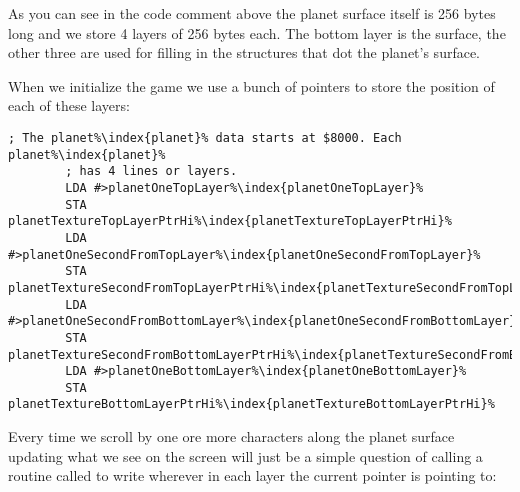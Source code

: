 As you can see in the code comment above the planet surface itself is 256 bytes long and we store 4 layers of 256
bytes each. The bottom layer is the surface, the other three are used for filling in the structures that dot the
planet's surface.

When we initialize the game we use a bunch of pointers to store the position of each of these layers:

\begin{lstlisting}[escapechar=\%]
        ; The planet%\index{planet}% data starts at $8000. Each planet%\index{planet}%
        ; has 4 lines or layers.
        LDA #>planetOneTopLayer%\index{planetOneTopLayer}%
        STA planetTextureTopLayerPtrHi%\index{planetTextureTopLayerPtrHi}%
        LDA #>planetOneSecondFromTopLayer%\index{planetOneSecondFromTopLayer}%
        STA planetTextureSecondFromTopLayerPtrHi%\index{planetTextureSecondFromTopLayerPtrHi}%
        LDA #>planetOneSecondFromBottomLayer%\index{planetOneSecondFromBottomLayer}%
        STA planetTextureSecondFromBottomLayerPtrHi%\index{planetTextureSecondFromBottomLayerPtrHi}%
        LDA #>planetOneBottomLayer%\index{planetOneBottomLayer}%
        STA planetTextureBottomLayerPtrHi%\index{planetTextureBottomLayerPtrHi}%
\end{lstlisting}

Every time we scroll by one ore more characters along the planet surface updating what we see on the screen will
just be a simple question of calling a routine called  to write wherever in each layer
the current pointer is pointing to:

